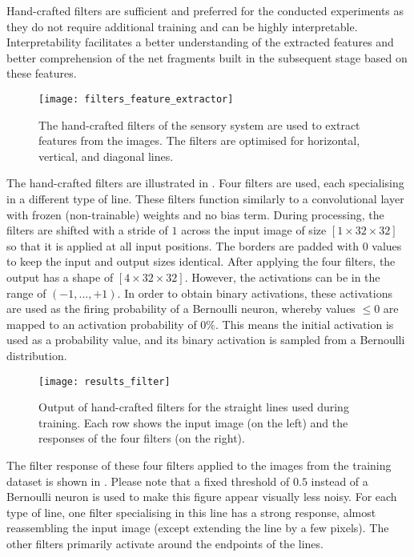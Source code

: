 Hand-crafted filters are sufficient and preferred for the conducted experiments as they do not require additional training and can be highly interpretable. Interpretability facilitates a better understanding of the extracted features and better comprehension of the net fragments built in the subsequent stage based on these features. 

\begin{figure}[h]
    \centering
    \texttt{[image: filters\_feature\_extractor]}
    \caption[Hand-crafted filters of the sensory system]{The hand-crafted filters of the sensory system are used to extract features from the images. The filters are optimised for horizontal, vertical, and diagonal lines.}
\end{figure}

The hand-crafted filters are illustrated in .
Four filters are used, each specialising in a different type of line.
These filters function similarly to a convolutional layer with frozen (non-trainable) weights and no bias term. 
During processing, the filters are shifted with a stride of $1$ across the input image of size $[1 \times 32 \times 32]$ so that it is applied at all input positions. 
The borders are padded with $0$ values to keep the input and output sizes identical.
After applying the four filters, the output has a shape of $[4 \times 32 \times 32]$. 
However, the activations can be in the range of $(-1, ..., +1)$.
In order to obtain binary activations, these activations are used as the firing probability of a Bernoulli neuron, whereby values $\leq 0$ are mapped to an activation probability of $0\%$.
This means the initial activation is used as a probability value, and its binary activation is sampled from a Bernoulli distribution.


\begin{figure}[h]
    \centering
    \texttt{[image: results\_filter]}
    \caption[Output of hand-crafted filters for straight lines]{Output of hand-crafted filters for the straight lines used during training. Each row shows the input image (on the left) and the responses of the four filters (on the right).}
\end{figure}

The filter response of these four filters applied to the images from the training dataset is shown in .
Please note that a fixed threshold of $0.5$ instead of a Bernoulli neuron is used to make this figure appear visually less noisy.
For each type of line, one filter specialising in this line has a strong response, almost reassembling the input image (except extending the line by a few pixels).
The other filters primarily activate around the endpoints of the lines.


